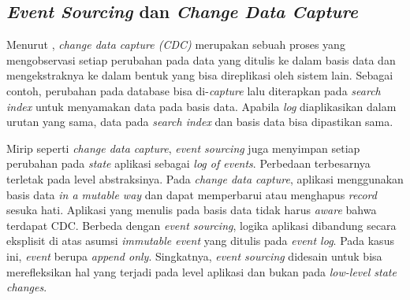 \subsection{\textit{Event Sourcing} dan \textit{Change Data Capture}}

Menurut \cite{dataIntensiveApplications}, \textit{change data capture (CDC)} merupakan sebuah proses yang mengobservasi setiap perubahan pada data yang ditulis ke dalam basis data dan mengekstraknya ke dalam bentuk yang bisa direplikasi oleh sistem lain. Sebagai contoh, perubahan pada database bisa di-\textit{capture} lalu diterapkan pada \textit{search index} untuk menyamakan data pada basis data. Apabila \textit{log} diaplikasikan dalam urutan yang sama, data pada \textit{search index} dan basis data bisa dipastikan sama.

Mirip seperti \textit{change data capture}, \textit{event sourcing} juga menyimpan setiap perubahan pada \textit{state} aplikasi sebagai \textit{log of events}. Perbedaan terbesarnya terletak pada level abstraksinya. Pada \textit{change data capture}, aplikasi menggunakan basis data \textit{in a mutable way} dan dapat memperbarui atau menghapus \textit{record} sesuka hati. Aplikasi yang menulis pada basis data tidak harus \textit{aware} bahwa terdapat CDC. Berbeda dengan \textit{event sourcing}, logika aplikasi dibandung secara eksplisit di atas asumsi \textit{immutable event} yang ditulis pada \textit{event log}. Pada kasus ini, \textit{event} berupa \textit{append only}. Singkatnya, \textit{event sourcing} didesain untuk bisa merefleksikan hal yang terjadi pada level aplikasi dan bukan pada \textit{low-level state changes}.